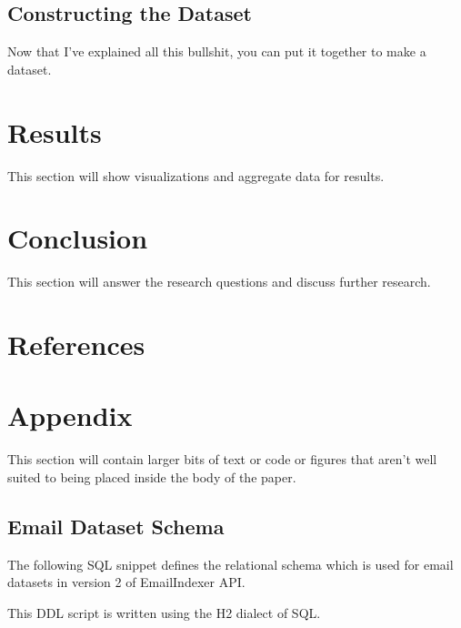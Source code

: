 \documentclass[a4paper, 12pt]{article}
\begin{document}
	\subsection{Constructing the Dataset}
		Now that I've explained all this bullshit, you can put it together to make a dataset.

\section{Results}
	This section will show visualizations and aggregate data for results.

\section{Conclusion}
	This section will answer the research questions and discuss further research.

\section{References}
	\printbibliography[heading=none]
	\newpage

\section{Appendix}
	This section will contain larger bits of text or code or figures that aren't well suited to being placed inside the body of the paper.
	
	\newpage
	\subsection{Email Dataset Schema}
		\label{sec:dataset-schema}
		The following SQL snippet defines the relational schema which is used for email datasets in version 2 of EmailIndexer API.
		
		\footnotesize{This DDL script is written using the H2 dialect of SQL.}
		
\end{document}
